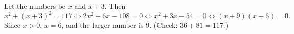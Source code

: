 Let the numbers be $x$ and $x+3$. Then
\[
x^2+(x+3)^2=117\iff2x^2+6x-108=0\iff x^2+3x-54=0\iff(x+9)(x-6)=0 .
\]
Since $x>0$, $x=6$, and the larger number is $\boxed{9}$. (Check: $36+81=117$.)
